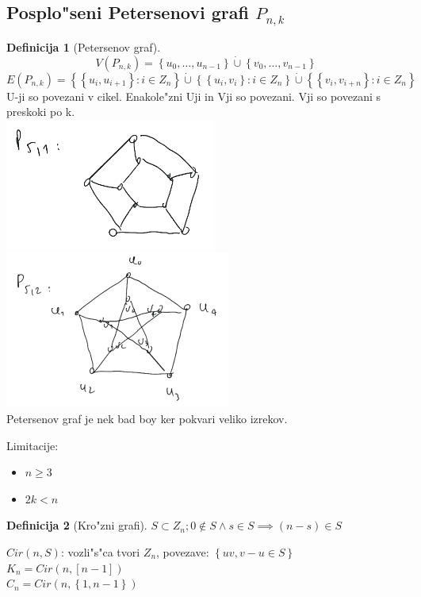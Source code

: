 \documentclass{article}
\theoremstyle{definition}
\newtheorem{definition}{Definicija}[section]
\begin{document}
	\subsection{Posplo"seni Petersenovi grafi $P_{n,k}$} 
	\begin{definition}[Petersenov graf]
		$$V(P_{n,k}) = \left\lbrace u_0, \ldots, u_{n-1} \right\rbrace \dot\cup \left\lbrace v_0, \ldots, v_{n-1} \right\rbrace $$  %
		$$E(P_{n,k}) = \left\lbrace\left\lbrace u_i,u_{i+1}\right\rbrace: i \in Z_n\right\rbrace \dot\cup \left\lbrace \left\lbrace u_i,v_i \right\rbrace: i \in Z_n \right\rbrace \dot\cup \left\lbrace\left\lbrace v_i,v_{i+n} \right\rbrace: i \in Z_n\right\rbrace$$ 
		U-ji so povezani v cikel. Enakole"zni Uji in Vji so povezani. Vji so povezani s preskoki po k.
		\\
		\includegraphics{petersenovi51}
		\includegraphics{petersenovi52}
		\\
		Petersenov graf je nek bad boy ker pokvari veliko izrekov.
	\end{definition}

	Limitacije:
	\begin{itemize}
		\item $n \geq 3$
		\item $2k < n$ 
	\end{itemize}

	
	
	\begin{definition}[Kro"zni grafi] 
		$S \subset Z_n; 0 \notin S \land s \in S \implies (n-s) \in S$
	\end{definition}
	$Cir(n, S)$: vozli"s"ca tvori $Z_n$, povezave: $\left\lbrace uv, v-u \in S\right\rbrace$ \\ 
	$K_n = Cir(n, [n-1])$ \\ 
	$C_n = Cir(n, \left\lbrace1, n-1\right\rbrace)$
	
\end{document}
